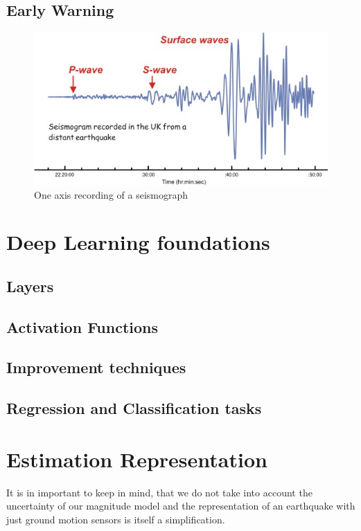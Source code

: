 \documentclass[thesis.tex]{subfiles}
\begin{document}
\subsection{Early Warning}
\begin{figure}[hb]
	\centering
	\includegraphics[width=0.6\linewidth]{../pictures/Prerequisites/dia_seismogram.jpg}
	\caption{One axis recording of a seismograph}
	\label{fig:seismogram}
\end{figure}
\section{Deep Learning foundations}
\subsection{Layers}
\subsection{Activation Functions}
\subsection{Improvement techniques}
\subsection{Regression and Classification tasks}
\section{Estimation Representation} 
 It is in important to keep in mind, that we do not take into account the uncertainty of our magnitude model and the representation of an earthquake with just ground motion sensors is itself a simplification.
\end{document}
